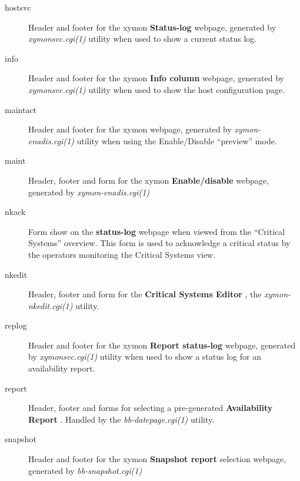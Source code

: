 \begin{description}
 

\item[hostsvc] Header and footer for the xymon \textbf{Status-log}
 webpage, generated by \emph{xymonsvc.cgi(1)}
 utility when used to show a current status log. 

 

\item[info] Header and footer for the xymon \textbf{Info column}
 webpage, generated by \emph{xymonsvc.cgi(1)}
 utility when used to show the host configuration page. 

 

\item[maintact] Header and footer for the xymon \textbf{}
 webpage, generated by \emph{xymon-enadis.cgi(1)}
 utility when using the Enable/Disable ``preview'' mode. 

 

\item[maint] Header, footer and form for the xymon \textbf{Enable/disable}
 webpage, generated by \emph{xymon-enadis.cgi(1)}


 

\item[nkack] Form show on the \textbf{status-log}
 webpage when viewed from the ``Critical Systems'' overview. This form is used to acknowledge a critical status by the operators monitoring the Critical Systems view. 

 

\item[nkedit] Header, footer and form for the \textbf{Critical Systems Editor}
, the \emph{xymon-nkedit.cgi(1)}
 utility. 

 

\item[replog] Header and footer for the xymon \textbf{Report status-log}
 webpage, generated by \emph{xymonsvc.cgi(1)}
 utility when used to show a status log for an availability report. 

 

\item[report] Header, footer and forms for selecting a pre-generated \textbf{Availability Report}
. Handled by the \emph{bb-datepage.cgi(1)}
 utility. 

 

\item[snapshot] Header and footer for the xymon \textbf{Snapshot report}
 selection webpage, generated by \emph{bb-snapshot.cgi(1)}


 


\end{description}

